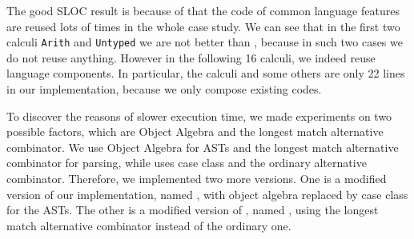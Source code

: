 The good SLOC result is because of that the code of common language features
are reused lots of times in the whole case study. We can see that in the first two calculi
\lstinline{Arith} and \lstinline{Untyped} we are not better than \ilyaimpl{},
because in such two cases we do not reuse anything.
However in the following 16 calculi, we indeed reuse language components.
In particular, the calculi  and some others are only 22 lines
in our implementation, because we only compose existing codes.

To discover the reasons of slower execution time, we made experiments
on two possible factors, which are Object Algebra and the longest match alternative combinator.
We use Object Algebra for ASTs and the longest match alternative combinator \inlinecode{|||} for parsing,
while \ilyaimpl{} uses case class and the ordinary alternative combinator.
Therefore, we implemented two more versions. One is a modified version of our implementation,
named \ourclass{}, with object algebra replaced by case class for the ASTs.
The other is a modified version of \ilyaimpl{}, named \ilyalongest{},
using the longest match alternative combinator instead of the ordinary one.

